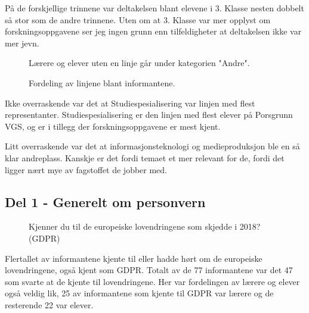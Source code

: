 På de forskjellige trinnene var deltakelsen blant elevene i 3. Klasse nesten dobbelt så stor som de andre trinnene. Uten om at 3. Klasse var mer opplyst om forskningsoppgavene ser jeg ingen grunn enn tilfeldigheter at deltakelsen ikke var mer jevn.

\begin{figure}[H]
    \centering
    Lærere og elever uten en linje går under kategorien "Andre".
    \caption{Fordeling av linjene blant informantene.}
\end{figure}
Ikke overraskende var det at Studiespesialisering var linjen med flest representanter. Studiespesialisering er den linjen med flest elever på Porsgrunn VGS, og er i tillegg der forskningsoppgavene er mest kjent. 

Litt overraskende var det at informasjonsteknologi og medieproduksjon ble en så klar andreplass. Kanskje er det fordi temaet et mer relevant for de, fordi det ligger nært mye av fagstoffet de jobber med.

\subsection{Del 1 - Generelt om personvern}
\begin{figure}[H]
    \centering
    \caption{Kjenner du til de europeiske lovendringene som skjedde i 2018? (GDPR)}
\end{figure}
Flertallet av informantene kjente til eller hadde hørt om de europeiske lovendringene, også kjent som GDPR. Totalt av de 77 informantene var det 47 som svarte at de kjente til lovendringene. Her var fordelingen av lærere og elever også veldig lik, 25 av informantene som kjente til GDPR var lærere og de resterende 22 var elever. 

